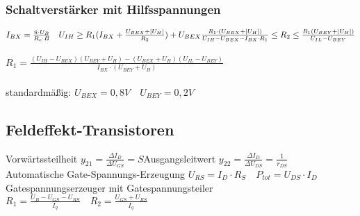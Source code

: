     \subsubsection{Schaltverstärker mit Hilfsspannungen}
    \label{Schaltverstaerker-Hilfsspannungen}
        \large
        $I_{BX}=\frac{\ddot{u}\cdot U_B}{R_c\cdot B}\quad U_{IH}\geq R_1(I_{BX}+\frac{U_{BEX}+|U_H|}{R_2})+U_{BEX}\\\\
        \frac{R_1\cdot (U_{BEX}+|U_H|)}{U_{IH}-U_{BEX}-I_{BX}\cdot R_1}\leq R_2\leq\frac{R_1(U_{BEY}+|U_H|)}{U_{IL}-U_{BEY}}$\\\\
        $R_1=\frac{(U_{IH}-U_{BEX})(U_{BEY}+U_H)-(U_{BEX}+U_H)(U_{IL}-U_{BEY})}{I_{BX}\cdot (U_{BEY}+U_H)}$\\\\
        \normalsize
        standardmäßig: $U_{BEX}=0,8V\quad U_{BEY}=0,2V$
\subsection{Feldeffekt-Transistoren}
    Vorwärtssteilheit $y_{21}=\frac{\Delta I_D}{\Delta U_{GS}}=S$\quad Ausgangsleitwert $y_{22}=\frac{\Delta I_D}{\Delta U_{DS}}=\frac{1}{r_{DS}}$\\
    Automatische Gate-Spannungs-Erzeugung $U_{RS}=I_D\cdot R_S\quad P_{tot}=U_{DS}\cdot I_D$\\
    Gatespannungserzeuger mit Gatespannungsteiler $R_1=\frac{U_B-U_{GS}-U_{RS}}{I_q}\quad R_2=\frac{U_{GS}+U_{RS}}{I_q}$
